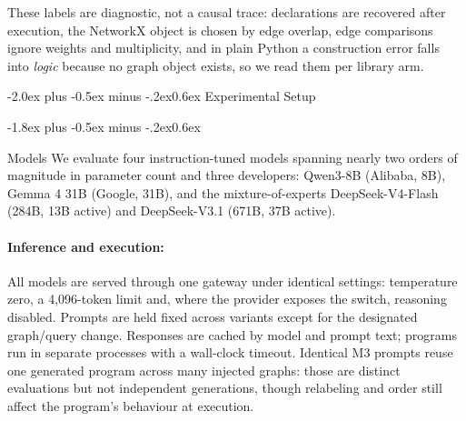 \documentclass[11pt]{article}
\makeatletter
\renewcommand\section{\@startsection{section}{1}{\z@}
  {-2.0ex plus -0.5ex minus -.2ex}{0.6ex}
  {\large\bfseries\centering}}
\renewcommand\subsection{\@startsection{subsection}{2}{\z@}
  {-1.8ex plus -0.5ex minus -.2ex}{0.6ex}
  {\normalsize\bfseries\raggedright}}
\makeatother
\begin{document}
These labels are diagnostic, not a causal trace: declarations are recovered after
execution, the NetworkX object is chosen by edge overlap, edge comparisons ignore
weights and multiplicity, and in plain Python a construction error falls into
\emph{logic} because no graph object exists, so we read them per library arm.

\section{Experimental Setup}
\label{sec:setup}

\subsection{Models}
We evaluate four instruction-tuned models spanning nearly two orders of magnitude in
parameter count and three developers: Qwen3-8B (Alibaba, 8B), Gemma 4 31B (Google, 31B), and the
mixture-of-experts DeepSeek-V4-Flash (284B, 13B active) and DeepSeek-V3.1 (671B,
37B active).

\paragraph{Inference and execution:}
All models are served through one gateway under identical settings: temperature
zero, a 4{,}096-token limit and, where the provider exposes the switch, reasoning
disabled. Prompts are held fixed across variants except for the designated
graph/query change. Responses are cached by model and prompt text; programs run in
separate processes with a wall-clock timeout. Identical M3 prompts reuse one
generated program across many injected graphs: those are distinct evaluations but
not independent generations, though relabeling and order still affect the program's
behaviour at execution.
\end{document}

